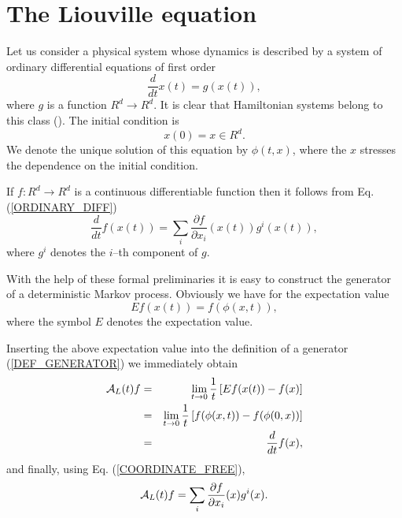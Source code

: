 \section{The Liouville equation}
Let us consider a physical system whose dynamics is described
by a system of ordinary differential equations of first order
\begin{equation}
\label{ORDINARY_DIFF}
\frac{d}{dt} x(t) = g(x(t)),
\end{equation}
where $g$ is a function $R^d \rightarrow R^d$. 
It is clear that Hamiltonian systems belong to this class 
(\cite{ARNOLD}). The initial 
condition is
\begin{equation*}
x(0) = x \in R^d.
\end{equation*}
We denote the unique solution of this equation by $\phi(t,x)$,
where the $x$ stresses the dependence on the initial condition.

If $f:R^d \rightarrow R^d$ is a continuous differentiable function
then it follows from Eq. (\ref{ORDINARY_DIFF}) 
\begin{equation}\label{COORDINATE_FREE}
\frac{d}{dt} f(x(t)) = \sum_i \frac{\partial f}{\partial x_i}
          (x(t)) g^i(x(t)),
\end{equation}
where $g^i$ denotes the $i$--th component of $g$. 


With the help of these formal preliminaries it is easy to 
construct the generator of a deterministic Markov process.
Obviously we have for the expectation value
\begin{equation*}
Ef(x(t)) = f(\phi(x,t)),
\end{equation*}
where the symbol $E$ denotes the expectation value.

Inserting the above expectation value into the definition of a 
generator (\ref{DEF_GENERATOR}) we immediately obtain
\begin{eqnarray*}
{\cal{A}}_L(t) f & = & \lim_{t\rightarrow 0} \frac{1}{t}
                        \left[ Ef(x(t)) - f(x)\right] \\
             & = & \lim_{t\rightarrow 0} \frac{1}{t}
                        \left[ f(\phi(x,t)) - f(\phi(0,x))\right] \\
              & = & \frac{d}{dt} f(x) ,
\end{eqnarray*}
and finally, using Eq. (\ref{COORDINATE_FREE}),
\begin{equation*}
{\cal{A}}_L(t) f = \sum_i \frac{\partial f}{\partial x_i}(x) g^i(x).
\end{equation*}


